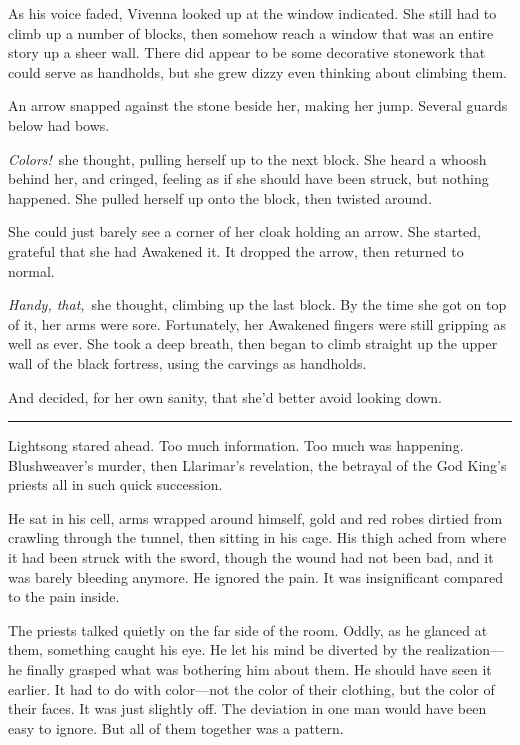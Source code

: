 As his voice faded, Vivenna looked up at the window indicated. She still had to climb up a number of blocks, then somehow reach a window that was an entire story up a sheer wall. There did appear to be some decorative stonework that could serve as handholds, but she grew dizzy even thinking about climbing them.

An arrow snapped against the stone beside her, making her jump. Several guards below had bows.

\textit{Colors!}~she thought, pulling herself up to the next block. She heard a whoosh behind her, and cringed, feeling as if she should have been struck, but nothing happened. She pulled herself up onto the block, then twisted around.

She could just barely see a corner of her cloak holding an arrow. She started, grateful that she had Awakened it. It dropped the arrow, then returned to normal.

\textit{Handy, that,}~she thought, climbing up the last block. By the time she got on top of it, her arms were sore. Fortunately, her Awakened fingers were still gripping as well as ever. She took a deep breath, then began to climb straight up the upper wall of the black fortress, using the carvings as handholds.

And decided, for her own sanity, that she’d better avoid looking down.

\bigskip \hrule \bigskip

Lightsong stared ahead. Too much information. Too much was happening. Blushweaver’s murder, then Llarimar’s revelation, the betrayal of the God King’s priests all in such quick succession.

He sat in his cell, arms wrapped around himself, gold and red robes dirtied from crawling through the tunnel, then sitting in his cage. His thigh ached from where it had been struck with the sword, though the wound had not been bad, and it was barely bleeding anymore. He ignored the pain. It was insignificant compared to the pain inside.

The priests talked quietly on the far side of the room. Oddly, as he glanced at them, something caught his eye. He let his mind be diverted by the realization—he finally grasped what was bothering him about them. He should have seen it earlier. It had to do with color—not the color of their clothing, but the color of their faces. It was just slightly off. The deviation in one man would have been easy to ignore. But all of them together was a pattern.

